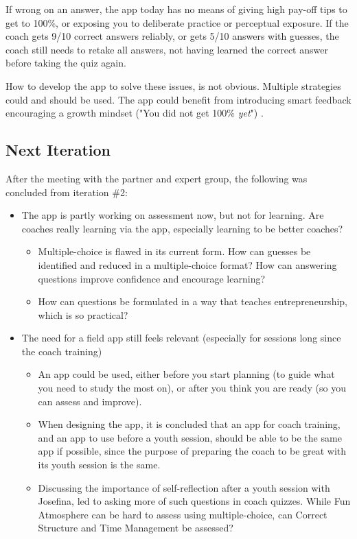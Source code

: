 If wrong on an answer, the app today has no means of giving high pay-off tips to get to 100\%, or exposing you to deliberate practice or perceptual exposure. If the coach gets 9/10 correct answers reliably, or gets 5/10 answers with guesses, the coach still needs to retake all answers, not having learned the correct answer before taking the quiz again.

How to develop the app to solve these issues, is not obvious. Multiple strategies could and should be used. The app could benefit from introducing smart feedback encouraging a growth mindset ("You did not get 100\% \textit{yet}") \cite{dweck}.

\subsection{Next Iteration}
After the meeting with the partner and expert group, the following was concluded from iteration \#2:

\begin{itemize}
\item The app is partly working on assessment now, but not for learning. Are coaches really learning via the app, especially learning to be better coaches?
  \begin{itemize}
    \item Multiple-choice is flawed in its current form. How can guesses be identified and reduced in a multiple-choice format? How can answering questions improve confidence and encourage learning?
    \item How can questions be formulated in a way that teaches entrepreneurship, which is so practical?
  \end{itemize}
\item The need for a field app still feels relevant (especially for sessions long since the coach training)
  \begin{itemize}
    \item An app could be used, either before you start planning (to guide what you need to study the most on), or after you think you are ready (so you can assess and improve).
    \item When designing the app, it is concluded that an app for coach training, and an app to use before a youth session, should be able to be the same app if possible, since the purpose of preparing the coach to be great with its youth session is the same.
    \item Discussing the importance of self-reflection after a youth session with Josefina, led to asking more of such questions in coach quizzes. While Fun Atmosphere can be hard to assess using multiple-choice, can Correct Structure and Time Management be assessed?
  \end{itemize}
\end{itemize}

